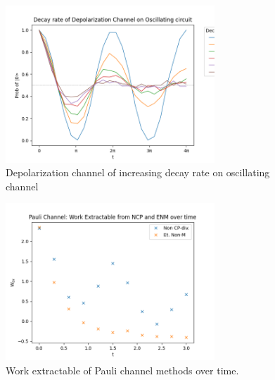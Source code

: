 \documentclass[12pt]{article}
\begin{document}
  \begin{figure}
    \centering
    \includegraphics[width=0.7\textwidth]{images/depolarization_decay_oscillating.png}
    \caption{Depolarization channel of increasing decay rate on oscillating channel}
    \label{fig:depolarization_deay_oscillating}
  \end{figure}

  \begin{figure}
    \centering
    \includegraphics[width=0.7\textwidth]{images/Pauli_work_extractable.png}
    \caption{Work extractable of Pauli channel methods over time.%
      \label{fig:Pauli_work_extractable}}
  \end{figure}

  \printbibliography
\end{document}
